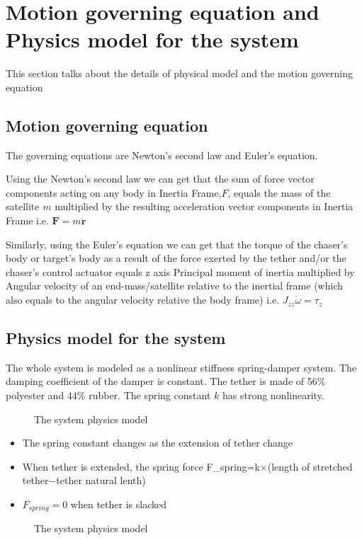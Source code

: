 \section{Motion governing equation and Physics model for the system}

This section talks about the details of physical model and the motion governing equation

\subsection{Motion governing equation}

The governing equations are Newton's second law and Euler's equation.

Using the Newton's second law we can get that the sum of force vector components acting on any body in Inertia Frame,$F$, equals the mass of the satellite $m$ multiplied by the resulting acceleration vector components in Inertia Frame i.e. $ \mathbf{F} = m\mathbf{\ddot{r}}$

Similarly, using the Euler's equation we can get that the torque of the chaser's body or target's body as a result of the force exerted by the tether and/or the chaser's control actuator equals z axis Principal moment of inertia multiplied by Angular velocity of an end-mass/satellite relative to the inertial frame (which also equals to the angular velocity relative the body frame) i.e. $J_{zz} \dot{\omega} = \tau_z$ 

\subsection{Physics model for the system}

The whole system is modeled as a nonlinear stiffness spring-damper system. The damping coefficient of the damper is constant. The tether is made of 56\% polyester and 44\% rubber. The spring constant $k$ has strong nonlinearity. 
\begin{figure}
	\begin{center}
	\end{center}
\caption{The system physics model}
\end{figure}

\begin{itemize}

\item The spring constant changes as the extension of tether change 

\item When tether is extended, the spring force F_spring=k×(length of stretched tether−tether natural lenth)

\item $F_{spring} = 0$ when tether is slacked

\end{itemize}

\begin{figure}
	\begin{center}
	\end{center}
\caption{The system physics model}
\end{figure}


\newpage
